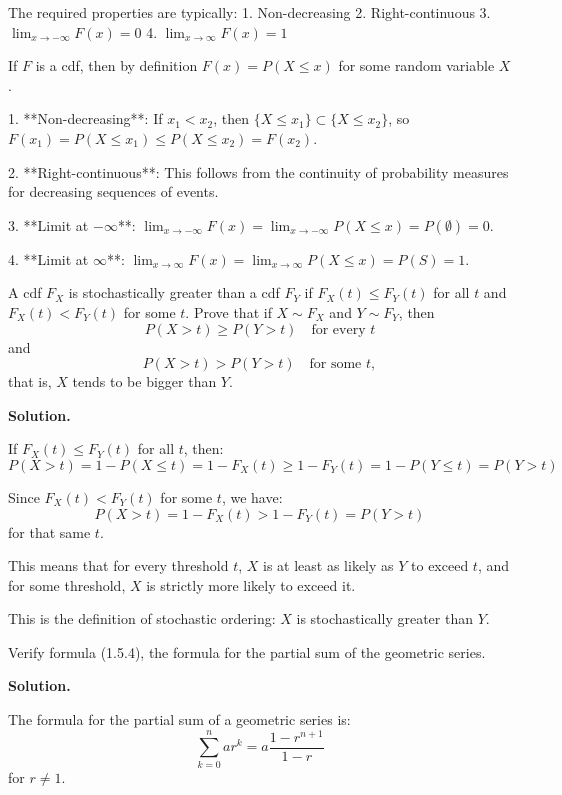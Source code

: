 The required properties are typically:
1. Non-decreasing
2. Right-continuous
3. $\lim_{x \to -\infty} F(x) = 0$
4. $\lim_{x \to \infty} F(x) = 1$

If $F$ is a cdf, then by definition $F(x) = P(X \leq x)$ for some random variable $X$.

1. **Non-decreasing**: If $x_1 < x_2$, then $\{X \leq x_1\} \subset \{X \leq x_2\}$, so $F(x_1) = P(X \leq x_1) \leq P(X \leq x_2) = F(x_2)$.

2. **Right-continuous**: This follows from the continuity of probability measures for decreasing sequences of events.

3. **Limit at $-\infty$**: $\lim_{x \to -\infty} F(x) = \lim_{x \to -\infty} P(X \leq x) = P(\emptyset) = 0$.

4. **Limit at $\infty$**: $\lim_{x \to \infty} F(x) = \lim_{x \to \infty} P(X \leq x) = P(S) = 1$.


\begin{problembox}
A cdf $F_{X}$ is stochastically greater than a cdf $F_{Y}$ if $F_{X}(t)\leq F_{Y}(t)$ for all $t$ and $F_{X}(t)<F_{Y}(t)$ for some $t$. Prove that if $X\sim F_{X}$ and $Y\sim F_{Y}$, then
\[ P(X>t)\geq P(Y>t)\quad\text{for every }t \]
and
\[ P(X>t)>P(Y>t)\quad\text{for some }t, \]
that is, $X$ tends to be bigger than $Y$.
\end{problembox}

\noindent\textbf{Solution.}

If $F_X(t) \leq F_Y(t)$ for all $t$, then:
\[ P(X > t) = 1 - P(X \leq t) = 1 - F_X(t) \geq 1 - F_Y(t) = 1 - P(Y \leq t) = P(Y > t) \]

Since $F_X(t) < F_Y(t)$ for some $t$, we have:
\[ P(X > t) = 1 - F_X(t) > 1 - F_Y(t) = P(Y > t) \]
for that same $t$.

This means that for every threshold $t$, $X$ is at least as likely as $Y$ to exceed $t$, and for some threshold, $X$ is strictly more likely to exceed it.

This is the definition of stochastic ordering: $X$ is stochastically greater than $Y$.


\begin{problembox}
Verify formula (1.5.4), the formula for the partial sum of the geometric series.
\end{problembox}

\noindent\textbf{Solution.}

The formula for the partial sum of a geometric series is:
\[ \sum_{k=0}^{n} ar^k = a \frac{1 - r^{n+1}}{1 - r} \]
for $r \neq 1$.

